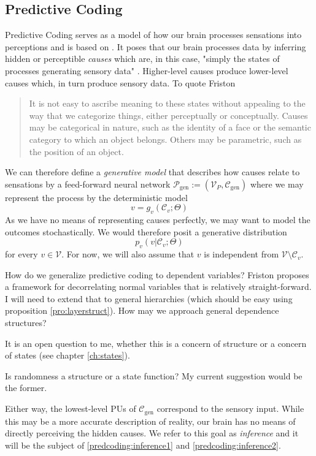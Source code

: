 \documentclass[a4paper,11pt]{article}
\begin{document}
\subsection{Predictive Coding}
\begin{Abs}\label{predcoding:generation}
Predictive Coding serves as a model of how our brain processes sensations into perceptions and is based on \cite{Mumford1992}. It poses that our brain processes data by inferring hidden or perceptible \emph{causes} which are, in this case, "simply the states of processes generating sensory data" \cite[][819]{Friston2005}. Higher-level causes produce lower-level causes which, in turn produce sensory data. To quote Friston \cite{Friston2005}
\begin{quote}
It is not easy to ascribe meaning to these states without appealing to the way that we categorize things, either perceptually or conceptually. Causes may be categorical in nature, such as the identity of a face or the semantic category to which an object belongs. Others may be parametric, such as the position of an object.\cite[][819]{Friston2005}
\end{quote}
We can therefore define a \emph{generative model} that describes how causes relate to sensations by a feed-forward neural network $\mathcal{P}_{\text{gen}}:=\left(\mathcal{V}_P,\mathcal{C}_{\text{gen}}\right)$ where we may represent the process by the deterministic model
\begin{equation}
v=g_v(\mathcal{C}_v;\Theta)
\end{equation}
As we have no means of representing causes perfectly, we may want to model the outcomes stochastically. We would therefore posit a generative distribution
\begin{equation}\label{predcoding:gendistr}
p_v(v|\mathcal{C}_v;\Theta)
\end{equation}
for every $v\in\mathcal{V}$. For now, we will also assume that $v$ is independent from $\mathcal{V}\setminus\mathcal{C}_v$.
\begin{OP}
How do we generalize predictive coding to dependent variables? Friston \cite{Friston2005} proposes a framework for decorrelating normal variables that is relatively straight-forward. I will need to extend that to general hierarchies (which should be easy using proposition \ref{pro:layerstruct}). How may we approach general dependence structures?
\end{OP}
It is an open question to me, whether this is a concern of structure or a concern of states (see chapter \ref{ch:states}).
\begin{OP}
Is randomness a structure or a state function? My current suggestion would be the former.
\end{OP}
Either way, the lowest-level PUs of $\mathcal{C}_{\text{gen}}$ correspond to the sensory input. While this may be a more accurate description of reality, our brain has no means of directly perceiving the hidden causes. We refer to this goal as \emph{inference} and it will be the subject of \ref{predcoding:inference1} and \ref{predcoding:inference2}.
\end{Abs}
\end{document}
